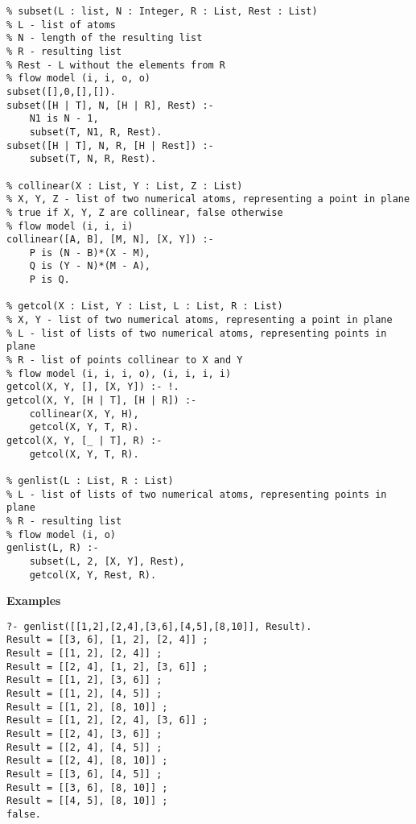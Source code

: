 \documentclass[11pt]{article}
\begin{document}
\begin{verbatim}
% subset(L : list, N : Integer, R : List, Rest : List)
% L - list of atoms
% N - length of the resulting list
% R - resulting list
% Rest - L without the elements from R
% flow model (i, i, o, o)
subset([],0,[],[]).
subset([H | T], N, [H | R], Rest) :-
    N1 is N - 1,
    subset(T, N1, R, Rest).
subset([H | T], N, R, [H | Rest]) :-
    subset(T, N, R, Rest).

% collinear(X : List, Y : List, Z : List)
% X, Y, Z - list of two numerical atoms, representing a point in plane
% true if X, Y, Z are collinear, false otherwise
% flow model (i, i, i)
collinear([A, B], [M, N], [X, Y]) :-
    P is (N - B)*(X - M),
    Q is (Y - N)*(M - A),
    P is Q.

% getcol(X : List, Y : List, L : List, R : List)
% X, Y - list of two numerical atoms, representing a point in plane
% L - list of lists of two numerical atoms, representing points in plane
% R - list of points collinear to X and Y
% flow model (i, i, i, o), (i, i, i, i)
getcol(X, Y, [], [X, Y]) :- !.
getcol(X, Y, [H | T], [H | R]) :-
    collinear(X, Y, H),
    getcol(X, Y, T, R).
getcol(X, Y, [_ | T], R) :-
    getcol(X, Y, T, R).

% genlist(L : List, R : List)
% L - list of lists of two numerical atoms, representing points in plane
% R - resulting list
% flow model (i, o) 
genlist(L, R) :-
    subset(L, 2, [X, Y], Rest),
    getcol(X, Y, Rest, R).
\end{verbatim}

\textbf{Examples}
\begin{verbatim}
?- genlist([[1,2],[2,4],[3,6],[4,5],[8,10]], Result).
Result = [[3, 6], [1, 2], [2, 4]] ;
Result = [[1, 2], [2, 4]] ;
Result = [[2, 4], [1, 2], [3, 6]] ;
Result = [[1, 2], [3, 6]] ;
Result = [[1, 2], [4, 5]] ;
Result = [[1, 2], [8, 10]] ;
Result = [[1, 2], [2, 4], [3, 6]] ;
Result = [[2, 4], [3, 6]] ;
Result = [[2, 4], [4, 5]] ;
Result = [[2, 4], [8, 10]] ;
Result = [[3, 6], [4, 5]] ;
Result = [[3, 6], [8, 10]] ;
Result = [[4, 5], [8, 10]] ;
false.
\end{verbatim}
\end{document}

